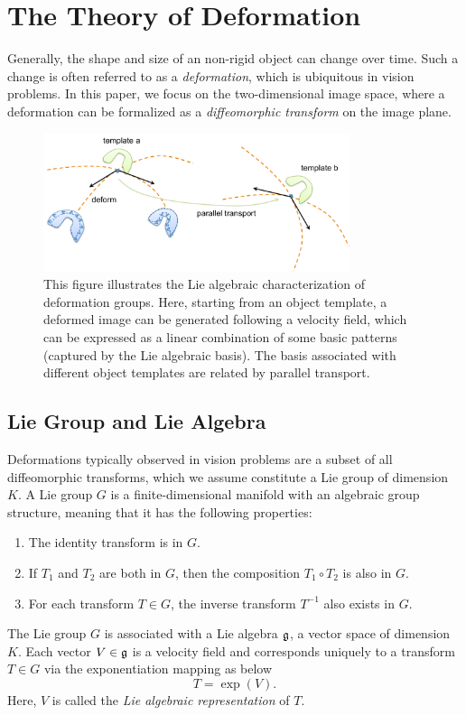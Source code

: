 
\section{The Theory of Deformation}
\label{sec:theory}

Generally, the shape and size of an non-rigid object can change over
time. Such a change is often referred to as a \emph{deformation},
which is ubiquitous in vision problems.
In this paper, we focus on the two-dimensional image space, where a
deformation can be formalized as a
\emph{diffeomorphic transform} on the image plane.

\begin{figure}[t]
    \centering
    \includegraphics[width=0.8\textwidth]{deform_show.pdf}
    \caption{This figure illustrates the Lie algebraic
      characterization of deformation groups. Here, starting from an
      object template, a deformed image can be generated following a
      velocity field, which can be expressed as a linear combination
      of some basic patterns (captured by the Lie algebraic basis).
      The basis associated with different object templates are related
      by parallel transport. 
    }
    \label{fig:deform_show}
\end{figure}


\subsection{Lie Group and Lie Algebra}

Deformations typically observed in vision problems are a subset of all
diffeomorphic transforms, which we assume constitute a Lie group of
dimension $K$. A Lie group $G$ is a finite-dimensional manifold with
an algebraic group structure, meaning that it has the following
properties:
\begin{enumerate}
    \item The identity transform is in $G$.
    \item If $T_1$ and $T_2$ are both in $G$, then the
    composition $T_1 \circ T_2$ is also in $G$.
    \item For each transform $T \in G$, the inverse transform $T^{-1}$
    also exists in $G$.
\end{enumerate}
The Lie group $G$ is associated with a Lie algebra $\mathfrak{g}$, a vector space of
dimension $K$. Each vector $V \in \mathfrak{g}$ is a velocity field and
corresponds uniquely to a transform $T \in G$ via the exponentiation
mapping as below
\begin{equation}
    T = \exp(V).
\end{equation}
Here, $V$ is called the \emph{Lie algebraic representation} of $T$. 

